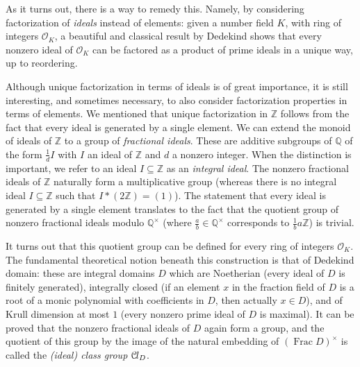 \documentclass[a4paper,USenglish,cleveref, autoref, thm-restate]{lipics-v2021}
\newcommand*{\OK}[1][K]{\mathcal{O}_{#1}}
\newcommand*{\Cl}{\mathcal{C}\kern-.075em l}
\newcommand{\Q}{\mathbb{Q}}
\newcommand{\Z}{\mathbb{Z}}
\DeclareMathOperator{\Frac}{Frac}
\begin{document}
As it turns out, there is a way to remedy this. Namely, by considering factorization of \emph{ideals} instead of elements: given a number field $K$, with ring of integers $\OK$, a beautiful and classical result by Dedekind shows that every nonzero ideal of $\OK$ can be factored as a product of prime ideals in a unique way, up to reordering.

Although unique factorization in terms of ideals is of great importance, it is still interesting, and sometimes %
necessary, to also consider factorization properties in terms of elements.
We mentioned that unique factorization in $\Z$ follows from the fact that every ideal is generated by a single element.
We can extend the monoid of ideals of $\Z$ to a group of \emph{fractional ideals}.
These are additive subgroups of $\Q$ of the form $\frac{1}{d} I$ with $I$ an ideal of $\Z$ and $d$ a nonzero integer.
When the distinction is important, we refer to an ideal $I \subseteq \Z$ as an \emph{integral ideal}.
The nonzero fractional ideals of $\Z$ naturally form a multiplicative group (whereas there is no integral ideal $I\subseteq \Z$ such that $I*(2\Z)=(1)$).
The statement that every ideal is generated by a single element
translates to the fact that the quotient group of nonzero fractional ideals modulo $\Q^\times$ (where $\frac{a}{b} \in \Q^\times$ corresponds to $\frac{1}{b} a \Z$) is trivial.

It turns out that this quotient group can be %
defined for every ring of integers $\OK$.
The fundamental theoretical notion beneath this construction is that of Dedekind domain: these are integral domains $D$ which are Noetherian (every ideal of $D$ is finitely generated), integrally closed (if an element $x$ in the fraction field of $D$ is a root of a monic polynomial with coefficients in $D$, then actually $x \in D$), and of Krull dimension at most $1$ (every nonzero prime ideal of $D$ is maximal).
It can be proved that the nonzero fractional ideals of $D$ %
again form a group, and the quotient of this group by the image of the natural embedding of $(\Frac D)^\times$ is called the \emph{\textup{(}ideal\textup{)} class group} $\Cl_{D}$.
\end{document}
